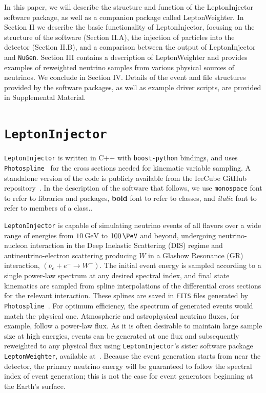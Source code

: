 \documentclass[main.tex]{subfiles}
\newcommand{\LeptonInjector}{\texttt{LeptonInjector}}
\newcommand{\LeptonWeighter}{\texttt{LeptonWeighter}}
\newcommand{\NuGen}{\texttt{NuGen}}
\newcommand{\PHOTOSPLINE}{\texttt{Photospline}}
\newcommand{\boostpython}{\texttt{boost-python}}
\begin{document}
In this paper, we will describe the structure and function of the LeptonInjector software package, as well as a companion package called LeptonWeighter.
In Section II we describe the basic functionality of LeptonInjector, focusing on the structure of the software (Section II.A), the injection of particles into the detector (Section II.B), and a comparison between the output of LeptonInjector and \NuGen{}.
Section III contains a description of LeptonWeighter and provides examples of reweighted neutrino samples from various physical sources of neutrinos.
We conclude in Section IV.
Details of the event and file structures provided by the software packages, as well as example driver scripts, are provided in Supplemental Material.

\section{\LeptonInjector\label{sec:overview}}

\LeptonInjector{} is written in {\ttf C++} with \boostpython{} bindings, and uses \PHOTOSPLINE~\cite{WHITEHORN20132214} for the cross sections needed for kinematic variable sampling.
A standalone version of the code is publicly available from the IceCube GitHub repository~\cite{LeptonInjectorRepository}.
In the description of the software that follows, we use \texttt{monospace} font to refer to libraries and packages, \textbf{bold} font to refer to classes, and \textit{italic} font to refer to members of a class..

\LeptonInjector{} is capable of simulating neutrino events of all flavors over a wide range of energies from $\SI{10}\GeV$ to $\SI{100}\PeV$ and beyond, undergoing neutrino-nucleon interaction in the Deep Inelastic Scattering (DIS) regime and antineutrino-electron scattering producing $W$ in a Glashow Resonance (GR) interaction, $(\bar{\nu}_{e}+e^{-} \to W^{-})$.
The initial event energy is sampled according to a single power-law spectrum at any desired spectral index, and final state kinematics are sampled from spline interpolations of the differential cross sections for the relevant interaction.
These splines are saved in \texttt{FITS} files generated by \PHOTOSPLINE~\cite{WHITEHORN20132214}.
For optimum efficiency, the spectrum of generated events would match the physical one.
Atmospheric and astrophysical neutrino fluxes, for example, follow a power-law flux.
As it is often desirable to maintain large sample size at high energies, events can be generated at one flux and subsequently reweighted to any physical flux using \LeptonInjector{}'s sister software package \LeptonWeighter{}, available at~\cite{LeptonWeighterRepository}.
Because the event generation starts from near the detector, the primary neutrino energy will be guaranteed to follow the spectral index of event generation; this is not the case for event generators beginning at the Earth's surface.
\end{document}
